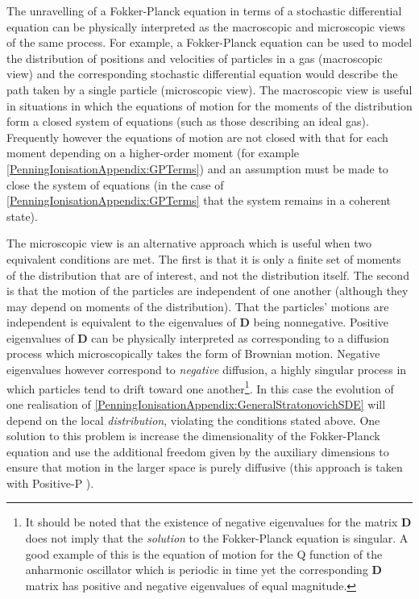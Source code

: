 The unravelling of a Fokker-Planck equation in terms of a stochastic differential equation can be physically interpreted as the macroscopic and microscopic views of the same process. For example, a Fokker-Planck equation can be used to model the distribution of positions and velocities of particles in a gas (macroscopic view) and the corresponding stochastic differential equation would describe the path taken by a single particle (microscopic view). The macroscopic view is useful in situations in which the equations of motion for the moments of the distribution form a closed system of equations (such as those describing an ideal gas). Frequently however the equations of motion are not closed with that for each moment depending on a higher-order moment (for example \eqref{PenningIonisationAppendix:GPTerms}) and an assumption must be made to close the system of equations (in the case of \eqref{PenningIonisationAppendix:GPTerms} that the system remains in a coherent state). 

The microscopic view is an alternative approach which is useful when two equivalent conditions are met. The first is that it is only a finite set of moments of the distribution that are of interest, and not the distribution itself. The second is that the motion of the particles are independent of one another (although they may depend on moments of the distribution). That the particles' motions are independent is equivalent to the eigenvalues of $\bm{D}$ being nonnegative. Positive eigenvalues of $\bm{D}$ can be physically interpreted as corresponding to a diffusion process which microscopically takes the form of Brownian motion. Negative eigenvalues however correspond to \emph{negative} diffusion, a highly singular process in which particles tend to drift toward one another\footnote{It should be noted that the existence of negative eigenvalues for the matrix $\bm{D}$ does not imply that the \emph{solution} to the Fokker-Planck equation is singular. A good example of this is the equation of motion for the Q function \citep{Scully} of the anharmonic oscillator which is periodic in time yet the corresponding $\bm{D}$ matrix has positive and negative eigenvalues of equal magnitude.}. In this case the evolution of one realisation of \eqref{PenningIonisationAppendix:GeneralStratonovichSDE} will depend on the local \emph{distribution}, violating the conditions stated above. One solution to this problem is increase the dimensionality of the Fokker-Planck equation and use the additional freedom given by the auxiliary dimensions to ensure that motion in the larger space is purely diffusive (this approach is taken with Positive-P \citep{GardinerQN}). 

